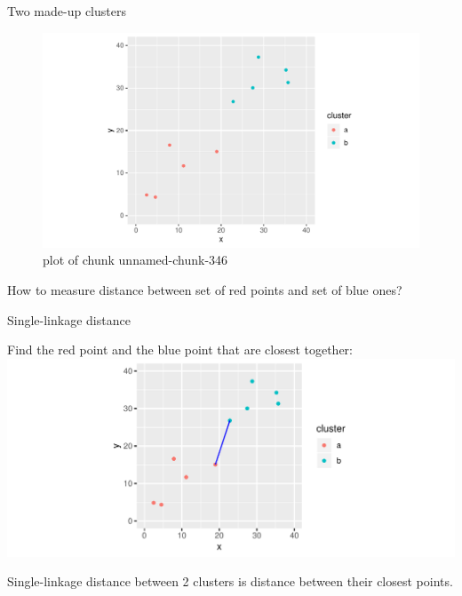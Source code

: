 \documentclass[ignorenonframetext,]{beamer}
\begin{document}
\begin{frame}{Two made-up clusters}
\protect\hypertarget{two-made-up-clusters}{}

\begin{figure}
\centering
\includegraphics{figure/unnamed-chunk-346-1.pdf}
\caption{plot of chunk unnamed-chunk-346}
\end{figure}

How to measure distance between set of red points and set of blue ones?

\end{frame}

\begin{frame}{Single-linkage distance}
\protect\hypertarget{single-linkage-distance}{}

Find the red point and the blue point that are closest together:
\includegraphics{figure/unnamed-chunk-347-1.pdf}

Single-linkage distance between 2 clusters is distance between their
closest points.

\end{frame}
\end{document}
